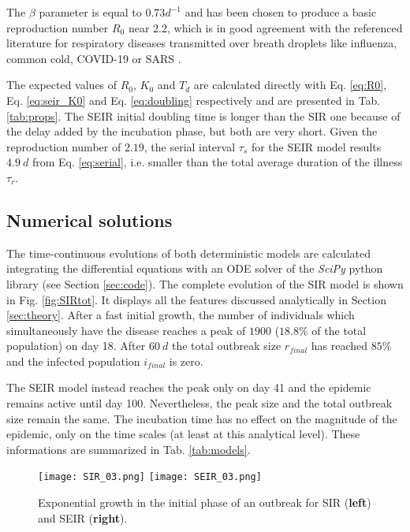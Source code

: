 \documentclass[DIV=12, BCOR=0pt]{scrartcl}  %
\begin{document}
  
  
 
  
  The $\beta$ parameter is equal to $0.73 d^{-1}$ and has been chosen to produce a basic reproduction number $R_0$ near 2.2, which is in good agreement with the referenced literature for respiratory diseases transmitted over breath droplets like influenza, common cold, COVID-19 or SARS \citep{bibid}.
  
  The expected values of $R_0$, $K_0$ and $T_d$ are calculated directly with Eq. \ref{eq:R0}, Eq. \ref{eq:seir_K0} and Eq. \ref{eq:doubling} respectively and are presented in Tab. \ref{tab:props}. The SEIR initial doubling time is longer than the SIR one because of the delay added by the incubation phase, but both are very short. Given the reproduction number of $2.19$, the serial interval $\tau_s$ for the SEIR model results $4.9 \ d$ from Eq. \ref{eq:serial}, i.e. smaller than the total average duration of the illness $\tau_{r}$.
    
  
  \subsection{Numerical solutions}
	The time-continuous evolutions of both deterministic models are calculated integrating the differential equations with an ODE solver of the \textit{SciPy} python library (see Section \ref{sec:code}). 
	The complete evolution of the SIR model is shown in Fig. \ref{fig:SIRtot}. It displays all the features discussed analytically in Section \ref{sec:theory}. After a fast initial growth, the number of individuals which simultaneously have the disease reaches a peak of $1900$ ($18.8 \%$ of the total population) on day 18. After $60 \ d$ the total outbreak size $r_{final}$ has reached $85 \%$ and the infected population $i_{final}$ is zero.
	
	The SEIR model instead reaches the peak only on day 41 and the epidemic remains active until day 100. Nevertheless, the peak size and the total outbreak size remain the same. The incubation time has no effect on the magnitude of the epidemic, only on the time scales (at least at this analytical level). These informations are summarized in Tab. \ref{tab:models}. 
	\begin{figure}[h!]
		\centering
		\texttt{[image: SIR\_03.png]}
		\texttt{[image: SEIR\_03.png]}
		\caption{Exponential growth in the initial phase of an outbreak for SIR (\textbf{left}) and SEIR (\textbf{right}). }
		\label{fig:BothExp}
	\end{figure}
\end{document}
